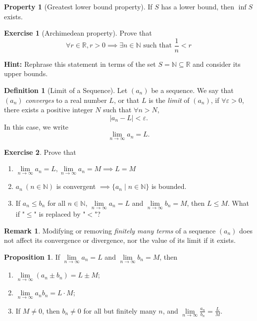 \documentclass{article}
\theoremstyle{definition}
\newtheorem{proposition}{Proposition}
\newtheorem{definition}{Definition}
\newtheorem{remark}{Remark}
\newtheorem{property}{Property}
\newtheorem{exercise}{Exercise}
\begin{document}
\begin{property}[Greatest lower bound property]
    If $S$ has a lower bound, then $\inf S$ exists.
\end{property}

\begin{exercise}[Archimedean property] 
    Prove that
    $$\forall r \in \mathbb{R}, r>0 \implies \exists n \in \mathbb{N} \text{ such that } \frac{1}{n} < r$$
\end{exercise}

\textbf{Hint:} Rephrase this statement in terms of the set $S = \mathbb{N} \subseteq \mathbb{R}$ 
and consider its upper bounds.

\begin{definition}[Limit of a Sequence]
Let $(a_n)$ be a sequence. We say that $(a_n)$ \emph{converges} to a real number $L$, or that $L$ is the \emph{limit} of $(a_n)$, if $\forall \varepsilon > 0$, there exists a positive integer $N$ such that $\forall n > N$,
\[
|a_n - L| < \varepsilon.
\]
In this case, we write
\[
\lim_{n \to \infty} a_n = L.
\]
\end{definition}

\begin{exercise}\label{e3}
    Prove that
    \begin{enumerate}
        \item $\lim\limits_{n \to \infty} a_n = L, \lim\limits_{n \to \infty} a_n = M \implies L=M$
        \item $a_n\ (n\in \mathbb{N})$ is convergent $\implies \{a_n\mid n \in \mathbb{N}\}$ is bounded.
        \item If $a_n\leq b_n$ for all $n\in \mathbb{N}$, $\lim\limits_{n\to \infty} a_n =L$ and $\lim\limits_{n\to \infty} b_n=M$, then $L\leq M$.
            What if "$\leq$" is replaced by "$<$"?
    \end{enumerate}
\end{exercise}

\begin{remark}
    Modifying or removing \emph{finitely many terms} of a sequence $(a_n)$ does not affect its convergence or divergence, nor the value of its limit if it exists.
\end{remark}

\begin{proposition}\label{prop:1}
    If $\lim\limits_{n\to \infty}a_n=L$ and $\lim\limits_{n\to \infty}b_n=M$, then
    \begin{enumerate}
        \item $\lim\limits_{n\to \infty}(a_n\pm b_n)=L\pm M$;
        \item $\lim\limits_{n\to \infty}a_n b_n=L\cdot M$;
        \item If $M\neq 0$, then $b_n \neq 0$ for all but finitely many $n$, and $\lim\limits_{n\to \infty}\frac{a_n}{b_n}=\frac{L}{M}$.
    \end{enumerate}
\end{proposition}
\end{document}
